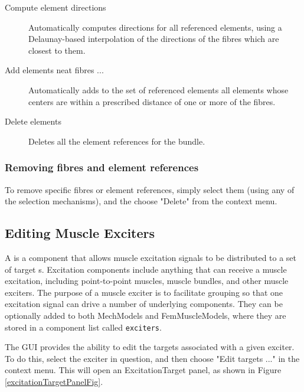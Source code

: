 \documentclass{article}
\begin{document}
\begin{description}

\item[Compute element directions]\mbox{}

Automatically computes directions for all referenced elements,
using a Delaunay-based interpolation of the directions of the
fibres which are closest to them.

\item[Add elements neat fibres ...]\mbox{}

Automatically adds to the set of referenced elements
all elements whose centers are within
a prescribed distance of one or more of the fibres.

\item[Delete elements]\mbox{}

Deletes all the element references for the bundle.

\end{description}

\subsubsection{Removing fibres and element references}

To remove specific fibres or element references, simply select them
(using any of the selection mechanisms), and the choose {\sf "Delete"}
from the context menu.

\subsection{Editing Muscle Exciters}

A  is a component that
allows muscle excitation signals to be distributed to a set of target
s.  Excitation
components include anything that can receive a muscle excitation, including
point-to-point muscles, muscle bundles, and other muscle exciters.
The purpose of a muscle exciter is to facilitate grouping so that one
excitation signal can drive a number of underlying components.
They can be optionally added to both MechModels and FemMuscleModels,
where they are stored in a component list called {\tt exciters}. 

The GUI provides the ability to edit the targets associated with a
given exciter. To do this, select the exciter in question, and then
choose {\sf "Edit targets ..."} in the context menu. This will open an
ExcitationTarget panel, as shown in Figure \ref{excitationTargetPanelFig}.
\end{document}
